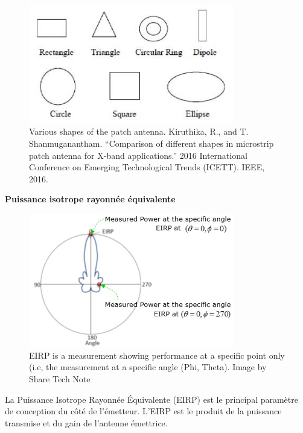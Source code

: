 \begin{figure}[H] %
    \centering
    \includegraphics[width=0.8\textwidth]{figures/6-53.jpg}
    
    \caption{Various shapes of the patch antenna. Kiruthika, R., and T. Shanmuganantham. “Comparison of different shapes in microstrip patch antenna for X-band applications.” 2016 International Conference on Emerging Technological Trends (ICETT). IEEE, 2016.}
    \label{fig:communication2}
\end{figure}

\textbf{Puissance isotrope rayonnée équivalente}

\begin{figure}[H] %
    \centering
    \includegraphics[width=0.8\textwidth]{figures/6-54.jpg}
    
    \caption{EIRP is a measurement showing performance at a specific point only (i.e, the measurement at a specific angle (Phi, Theta). Image by Share Tech Note}
    \label{fig:communication2}
\end{figure}


La Puissance Isotrope Rayonnée Équivalente (EIRP) est le principal paramètre de conception du côté de l’émetteur. L’EIRP est le produit de la puissance transmise et du gain de l’antenne émettrice. 

